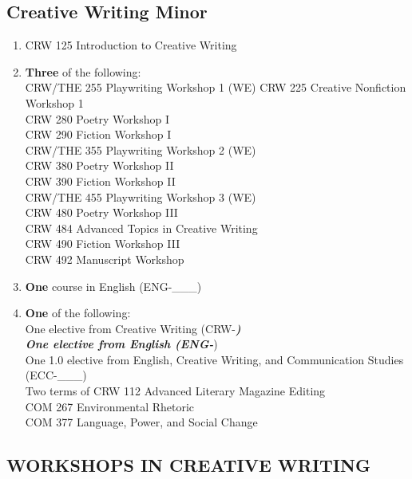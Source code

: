 \documentclass[
  letterpaper,
]{scrbook}
\providecommand{\tightlist}{%
  \setlength{\itemsep}{0pt}\setlength{\parskip}{0pt}}
\begin{document}
\subsection{Creative Writing Minor}\label{creative-writing-minor}

\begin{enumerate}
\def\labelenumi{\arabic{enumi}.}
\tightlist
\item
  CRW 125 Introduction to Creative Writing\\
\item
  \textbf{Three} of the following:\\
  CRW/THE 255 Playwriting Workshop 1 (WE) CRW 225 Creative Nonfiction
  Workshop 1\\
  CRW 280 Poetry Workshop I\\
  CRW 290 Fiction Workshop I\\
  CRW/THE 355 Playwriting Workshop 2 (WE)\\
  CRW 380 Poetry Workshop II\\
  CRW 390 Fiction Workshop II\\
  CRW/THE 455 Playwriting Workshop 3 (WE)\\
  CRW 480 Poetry Workshop III\\
  CRW 484 Advanced Topics in Creative Writing\\
  CRW 490 Fiction Workshop III\\
  CRW 492 Manuscript Workshop\\
\item
  \textbf{One} course in English (ENG-\_\_\_)\\
\item
  \textbf{One} of the following:\\
  One elective from Creative Writing (CRW-\textbf{\emph{)\\
  One elective from English (ENG-}})\\
  One 1.0 elective from English, Creative Writing, and Communication
  Studies (ECC-\_\_\_)\\
  Two terms of CRW 112 Advanced Literary Magazine Editing\\
  COM 267 Environmental Rhetoric\\
  COM 377 Language, Power, and Social Change
\end{enumerate}

\subsection{WORKSHOPS IN CREATIVE
WRITING}\label{workshops-in-creative-writing}
\end{document}
